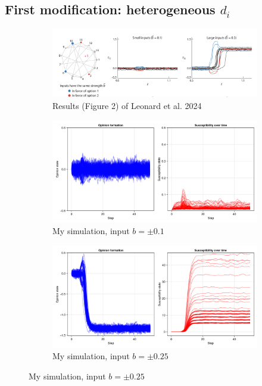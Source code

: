 \documentclass[]{article}
\begin{document}
\subsection{First modification: heterogeneous $d_i$}



\begin{figure}
	\centering
	\begin{subfigure}[t]{0.8\textwidth}
		\centering
		\includegraphics[width=\textwidth]{../plots/leonardfig2panA.png} 
		\caption{Results (Figure 2) of Leonard et al. 2024} \label{fig:damping1}
	\end{subfigure}
	
	\begin{subfigure}[t]{0.6\textwidth}
		\centering
		\includegraphics[width=\textwidth]{../plots/old/nog_constd_lowsig.png} 
		\caption{My simulation, input $b = \pm 0.1 $} \label{fig:damping2}
	\end{subfigure}
	
	\begin{subfigure}[t]{0.6\textwidth}
		\centering
		\includegraphics[width=\textwidth]{../plots/old/nog_constd_medsig.png} 
		\caption{My simulation, input $b = \pm 0.25 $} \label{fig:damping3}
	\end{subfigure}
	

\end{figure}
\end{document}
